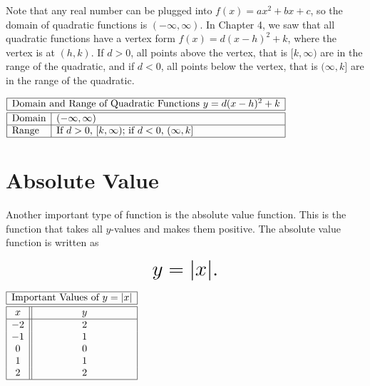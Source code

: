 \documentclass[nooutcomes]{ximera}
\begin{document}
Note that any real number can be plugged into $f(x) = ax^2 + bx + c$, so the domain of quadratic functions is $(-\infty, \infty)$. In Chapter 4, we saw that all quadratic functions have a vertex form $f(x) = d(x - h)^2 + k$, where the vertex is at $(h, k)$. If $d > 0$, all points above the vertex, that is $[k, \infty)$ are in the range of the quadratic, and if $d < 0$, all points below the vertex, that is $(\infty, k]$ are in the range of the quadratic.

\begin{center}
$
\begin{array}{|l|l|}
 \hline
 \multicolumn{2}{|c|}{\text{\normalfont Domain and Range of Quadratic Functions } y=d(x - h)^2 + k} \\
\hline
 \hline
\text{Domain} & (-\infty, \infty) \\ \hline
\text{Range} & \text{If } d > 0\text{, }[k, \infty)\text{; if }d < 0\text{, }(\infty, k]\\ \hline
\end{array}
$
\end{center}

\newpage


\section{Absolute Value}
Another important type of function is the absolute value function.  This is the function that takes all $y$-values and makes them positive.  The absolute value function is written as 

$$ \mbox{\huge $y=|x|.$}$$ 

\begin{image}
\end{image}

\begin{center}
\(
\begin{array}{ |c || c|  }
 \hline
 \multicolumn{2}{|c|}{\text{\normalfont Important Values of } y=|x|} \\
\hline
 \hline
 x & y\\
 \hline
 -2&2\\ 
-1&1\\ 
0&0\\
 1&1\\
 2&2\\
 \hline
\end{array}
\)
\end{center}
\end{document}

